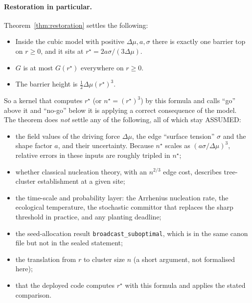 \documentclass[11pt]{article}
\theoremstyle{definition}
\theoremstyle{remark}
\begin{document}
\paragraph{Restoration in particular.} Theorem~\ref{thm:restoration} settles the following:
\begin{itemize}
\item Inside the cubic model with positive $\Delta\mu,a,\sigma$ there is exactly one barrier top on $r\ge0$, and it sits at
$r^\star=2a\sigma/(3\Delta\mu)$.
\item $G$ is at most $G(r^\star)$ everywhere on $r\ge 0$.
\item The barrier height is $\tfrac12\Delta\mu (r^\star)^3$.
\end{itemize}
So a kernel that computes $r^\star$ (or $n^\star=(r^\star)^3$) by this formula and calls ``go'' above it and ``no-go'' below it
is applying a correct consequence of the model.
The theorem does \emph{not} settle any of the following, all of which stay ASSUMED:
\begin{itemize}
\item the field values of the driving force $\Delta\mu$, the edge ``surface tension'' $\sigma$ and the shape factor $a$, and
their uncertainty. Because $n^\star$ scales as $(a\sigma/\Delta\mu)^3$, relative errors in these inputs are roughly tripled in $n^\star$;
\item whether classical nucleation theory, with an $n^{2/3}$ edge cost, describes tree-cluster establishment at a given site;
\item the time-scale and probability layer: the Arrhenius nucleation rate, the ecological temperature, the stochastic committor
that replaces the sharp threshold in practice, and any planting deadline;
\item the seed-allocation result \texttt{broadcast\_suboptimal}, which is in the same canon file but not in the sealed statement;
\item the translation from $r$ to cluster size $n$ (a short argument, not formalised here);
\item that the deployed code computes $r^\star$ with this formula and applies the stated comparison.
\end{itemize}
\end{document}
